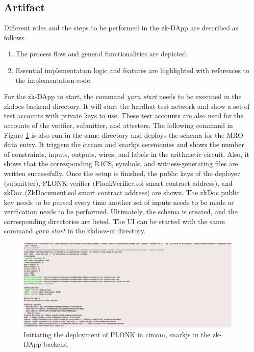 \subsection{Artifact}
Different roles and the steps to be performed in the zk-DApp are described as follows.
\begin{enumerate}
\item The process flow and general functionalities are depicted.
\item Essential implementation logic and features are highlighted with references to the implementation code.
\end{enumerate}
For the zk-DApp to start, the command \textit{yarn start} needs to be executed in the zkdocs-backend directory. It will start the hardhat test network and show a set of test accounts with private keys to use. These test accounts are also used for the accounts of the verifier, submitter, and attesters. The following command in Figure \ref{fig:second-cmd} is also run in the same directory and deploys the schema for the MRO data entry. It triggers the circom and snarkjs ceremonies and shows the number of constraints, inputs, outputs, wires, and labels in the arithmetic circuit. Also, it shows that the corresponding R1CS, symbols, and witness-generating files are written successfully. Once the setup is finished, the public keys of the deployer (submitter), PLONK verifier (PlonkVerifier.sol smart contract address), and zkDoc (ZkDocument.sol smart contract address) are shown. The zkDoc public key needs to be parsed every time another set of inputs needs to be made or verification needs to be performed. Ultimately, the schema is created, and the corresponding directories are listed. The UI can be started with the same command \textit{yarn start} in the zkdocs-ui directory.

\begin{figure}[hbt]
	\centering
		\includegraphics[width=1.0\textwidth]{Pictures/second-cmd.png}
	\caption{Initiating the deployment of PLONK in circom, snarkjs in the zk-DApp backend}
	\label{fig:second-cmd}
\end{figure}

